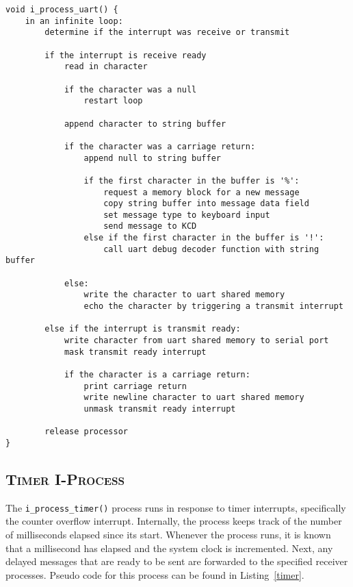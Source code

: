 \documentclass[oneside]{report}
\begin{document}
\begin{lstlisting}
void i_process_uart() {
    in an infinite loop:
        determine if the interrupt was receive or transmit

        if the interrupt is receive ready
            read in character

            if the character was a null
                restart loop

            append character to string buffer
            
            if the character was a carriage return:
                append null to string buffer
                
                if the first character in the buffer is '%':
                    request a memory block for a new message
                    copy string buffer into message data field
                    set message type to keyboard input
                    send message to KCD
                else if the first character in the buffer is '!':
                    call uart debug decoder function with string buffer        

            else:
                write the character to uart shared memory
                echo the character by triggering a transmit interrupt

        else if the interrupt is transmit ready:
            write character from uart shared memory to serial port
            mask transmit ready interrupt
            
            if the character is a carriage return:
                print carriage return
                write newline character to uart shared memory
                unmask transmit ready interrupt
            
        release processor
}
\end{lstlisting}

\subsection{\textsc{Timer I-Process}}

The \texttt{i\_process\_timer()} process runs in response to timer
interrupts, specifically the counter overflow interrupt. Internally,
the process keeps track of the number of milliseconds elapsed since
its start. Whenever the process runs, it is known that a millisecond
has elapsed and the system clock is incremented. Next, any delayed
messages that are ready to be sent are forwarded to the specified
receiver processes. Pseudo code for this process can be found in
Listing~\ref{timer}.
\end{document}
